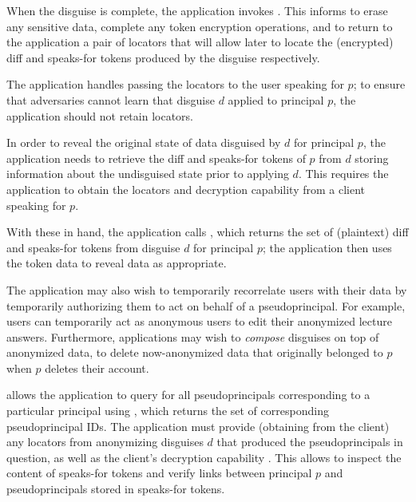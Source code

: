 When the disguise is complete, the application invokes . This informs \sys to erase
any sensitive data, complete any token encryption operations, and to return to the application a
pair of locators that will allow \sys later to locate the (encrypted) diff and speaks-for tokens
produced by the disguise respectively.

The application handles passing the locators  to the user speaking for $p$; to ensure that
adversaries cannot learn that disguise $d$ applied to principal $p$, the application should not
retain locators.

In order to reveal the original state of data disguised by $d$ for principal $p$, the application
needs to retrieve the diff and speaks-for tokens of $p$ from $d$ storing information about the undisguised
state prior to applying $d$.
This requires the application to obtain the locators  and decryption capability 
from a client speaking for $p$.

With these in hand, the application calls , which returns the set of
(plaintext) diff and speaks-for tokens from disguise $d$ for principal $p$; the application then uses
the token data to reveal data as appropriate.

The application may also wish to temporarily recorrelate users with their data by temporarily
authorizing them to act on behalf of a pseudoprincipal. For example, users can temporarily act as
anonymous users to edit their anonymized lecture answers. Furthermore, applications may wish to
\emph{compose} disguises on top of anonymized data, to \eg delete now-anonymized data that
originally belonged to $p$ when $p$ deletes their account.

\sys allows the application to query for all pseudoprincipals corresponding to a particular
principal using , which returns the set of corresponding pseudoprincipal
IDs. The application must provide (obtaining from the client) any locators  from
anonymizing disguises $d$ that produced the pseudoprincipals in question, as well as the client's
decryption capability . This allows \sys to inspect the content of speaks-for tokens and
verify links between principal $p$ and pseudoprincipals stored in speaks-for tokens.

